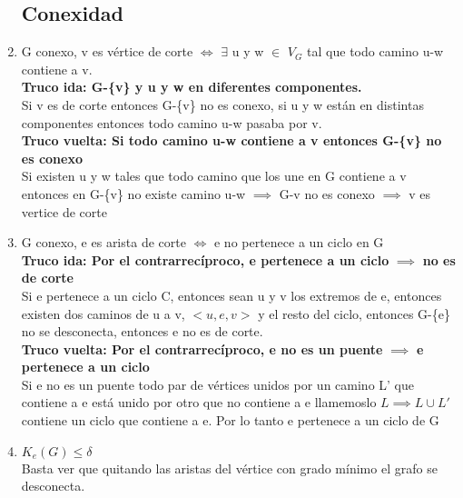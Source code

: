 \documentclass{article}
\begin{document}
\begin{enumerate}
\subsection{Conexidad}

    \item G conexo, v es vértice de corte $\iff$ $\exists$ u y w $\in$ $V_G$ tal que todo camino u-w contiene a v. \\
    \textbf{Truco ida: G-\{v\} y u y w en diferentes componentes.} \\
    Si v es de corte entonces G-\{v\} no es conexo, si u y w están en distintas componentes entonces todo camino u-w pasaba por v. \\
    \textbf{Truco vuelta: Si todo camino u-w contiene a v entonces G-\{v\} no es conexo} \\
    Si existen u y w tales que todo camino que los une en G contiene a v entonces en G-\{v\} no existe camino u-w $\implies$ G-{v} no es conexo $\implies$ v es vertice de corte
    
    \item G conexo, e es arista de corte $\iff$ e no pertenece a un ciclo en G \\
    \textbf{Truco ida: Por el contrarrecíproco, e pertenece a un ciclo} $\implies$ \textbf{no es de corte} \\
    Si e pertenece a un ciclo C, entonces sean u y v los extremos de e, entonces existen dos caminos de u a v, $<u,e,v>$ y el resto del ciclo, entonces G-\{e\} no se desconecta, entonces e no es de corte. \\
    \textbf{Truco vuelta: Por el contrarrecíproco, e no es un puente} $\implies$ \textbf{e pertenece a un ciclo} \\
    Si e no es un puente todo par de vértices unidos por un camino L' que contiene a e está unido por otro que no contiene a e llamemoslo $L\implies L \cup L'$ contiene un ciclo que contiene a e. Por lo tanto e pertenece a un ciclo de G
    
    \item $K_e(G)\leq\delta$ \\
    Basta ver que quitando las aristas del vértice con grado mínimo el grafo se desconecta.
    

\end{enumerate}
\end{document}
